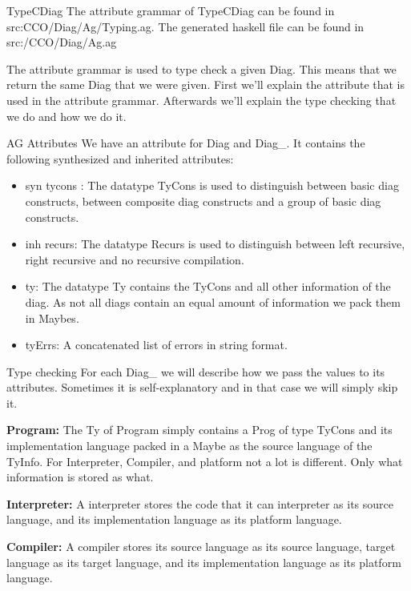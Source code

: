 \documentclass{article}
\begin{document}
\begin{subsection}{TypeCDiag}
The attribute grammar of TypeCDiag can be found in src:CCO/Diag/Ag/Typing.ag. The generated haskell file can be found in src:/CCO/Diag/Ag.ag

\hfill \break

The attribute grammar is used to type check a given Diag. This means that we return the same Diag that we were given. First we'll explain the attribute that is used in the attribute grammar. Afterwards we'll explain the type checking that we do and how we do it.
\begin{subsubsection}{AG Attributes}
We have an attribute for Diag and Diag\_. It contains the following synthesized and inherited attributes:
	\begin{itemize}
	\item syn tycons : The datatype TyCons is used to distinguish between basic diag constructs, between composite diag constructs and a group of basic diag constructs.
	\item inh recurs: The datatype Recurs is used to distinguish between left recursive, right recursive and no recursive compilation.
	\item ty: The datatype Ty contains the TyCons and all other information of the diag. As not all diags contain an equal amount of information we pack them in Maybes.
	\item tyErrs: A concatenated list of errors in string format.
	\end{itemize}
\end{subsubsection}
\begin{subsubsection}{Type checking}
For each Diag\_ we will describe how we pass the values to its attributes. Sometimes it is self-explanatory and in that case we will simply skip it.

\hfill \break

\textbf{Program:} The Ty of Program simply contains a Prog of type TyCons and its implementation language packed in a Maybe as the source language of the TyInfo. For Interpreter, Compiler, and platform not a lot is different. Only what information is stored as what.

\hfill \break

\textbf{Interpreter:} A interpreter stores the code that it can interpreter as its source language, and its implementation language as its platform language.

\hfill \break

\textbf{Compiler:} A compiler stores its source language as its source language, target language as its target language, and its implementation language as its platform language.


\end{subsubsection}
\end{subsection}
\end{document}
